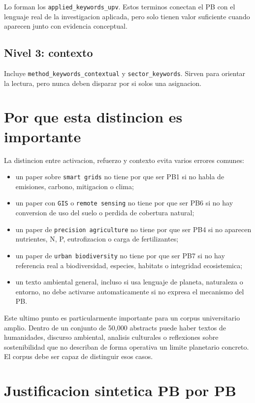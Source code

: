 \documentclass[11pt,a4paper]{article}
\begin{document}
Lo forman los \texttt{applied\_keywords\_upv}. Estos terminos conectan el PB con el lenguaje real de la investigacion aplicada, pero solo tienen valor suficiente cuando aparecen junto con evidencia conceptual.

\subsection{Nivel 3: contexto}

Incluye \texttt{method\_keywords\_contextual} y \texttt{sector\_keywords}. Sirven para orientar la lectura, pero nunca deben disparar por si solos una asignacion.

\section{Por que esta distincion es importante}

La distincion entre activacion, refuerzo y contexto evita varios errores comunes:

\begin{itemize}
\item un paper sobre \texttt{smart grids} no tiene por que ser PB1 si no habla de emisiones, carbono, mitigacion o clima;
\item un paper con \texttt{GIS} o \texttt{remote sensing} no tiene por que ser PB6 si no hay conversion de uso del suelo o perdida de cobertura natural;
\item un paper de \texttt{precision agriculture} no tiene por que ser PB4 si no aparecen nutrientes, N, P, eutrofizacion o carga de fertilizantes;
\item un paper de \texttt{urban biodiversity} no tiene por que ser PB7 si no hay referencia real a biodiversidad, especies, habitats o integridad ecosistemica;
\item un texto ambiental general, incluso si usa lenguaje de planeta, naturaleza o entorno, no debe activarse automaticamente si no expresa el mecanismo del PB.
\end{itemize}

Este ultimo punto es particularmente importante para un corpus universitario amplio. Dentro de un conjunto de 50{,}000 abstracts puede haber textos de humanidades, discurso ambiental, analisis culturales o reflexiones sobre sostenibilidad que no describan de forma operativa un limite planetario concreto. El corpus debe ser capaz de distinguir esos casos.

\section{Justificacion sintetica PB por PB}
\end{document}
